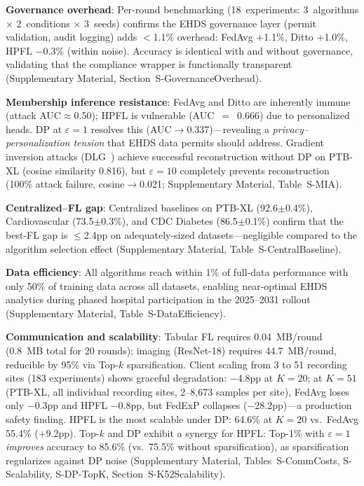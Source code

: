 \documentclass[conference]{IEEEtran}
\begin{document}
\textbf{Governance overhead}: Per-round benchmarking (18~experiments: 3~algorithms $\times$ 2~conditions $\times$ 3~seeds) confirms the EHDS governance layer (permit validation, audit logging) adds $<$1.1\% overhead: FedAvg $+$1.1\%, Ditto $+$1.0\%, HPFL $-$0.3\% (within noise). Accuracy is identical with and without governance, validating that the compliance wrapper is functionally transparent (Supplementary Material, Section~S-GovernanceOverhead).

\textbf{Membership inference resistance}: FedAvg and Ditto are inherently immune (attack AUC$\approx$0.50); HPFL is vulnerable (AUC~$=$~0.666) due to personalized heads. DP at $\varepsilon{=}1$ resolves this (AUC$\to$0.337)---revealing a \textit{privacy--personalization tension} that EHDS data permits should address. Gradient inversion attacks (DLG~\cite{zhu2019deep}) achieve successful reconstruction without DP on PTB-XL (cosine similarity 0.816), but $\varepsilon{=}10$ completely prevents reconstruction (100\% attack failure, cosine$\to$0.021; Supplementary Material, Table~S-MIA).

\textbf{Centralized--FL gap}: Centralized baselines on PTB-XL (92.6$\pm$0.4\%), Cardiovascular (73.5$\pm$0.3\%), and CDC Diabetes (86.5$\pm$0.1\%) confirm that the best-FL gap is $\leq$2.4pp on adequately-sized datasets---negligible compared to the algorithm selection effect (Supplementary Material, Table~S-CentralBaseline).

\textbf{Data efficiency}: All algorithms reach within 1\% of full-data performance with only 50\% of training data across all datasets, enabling near-optimal EHDS analytics during phased hospital participation in the 2025--2031 rollout (Supplementary Material, Table~S-DataEfficiency).

\textbf{Communication and scalability}: Tabular FL requires 0.04~MB/round (0.8~MB total for 20 rounds); imaging (ResNet-18) requires 44.7~MB/round, reducible by 95\% via Top-$k$ sparsification. Client scaling from 3 to 51 recording sites (183 experiments) shows graceful degradation: $-$4.8pp at $K{=}20$; at $K{=}51$ (PTB-XL, all individual recording sites, 2--8,673 samples per site), FedAvg loses only $-$0.3pp and HPFL $-$0.8pp, but FedExP collapses ($-$28.2pp)---a production safety finding. HPFL is the most scalable under DP: 64.6\% at $K{=}20$ vs.\ FedAvg 55.4\% ($+$9.2pp). Top-$k$ and DP exhibit a synergy for HPFL: Top-1\% with $\varepsilon{=}1$ \textit{improves} accuracy to 85.6\% (vs.\ 75.5\% without sparsification), as sparsification regularizes against DP noise (Supplementary Material, Tables~S-CommCosts, S-Scalability, S-DP-TopK, Section~S-K52Scalability).
\end{document}
